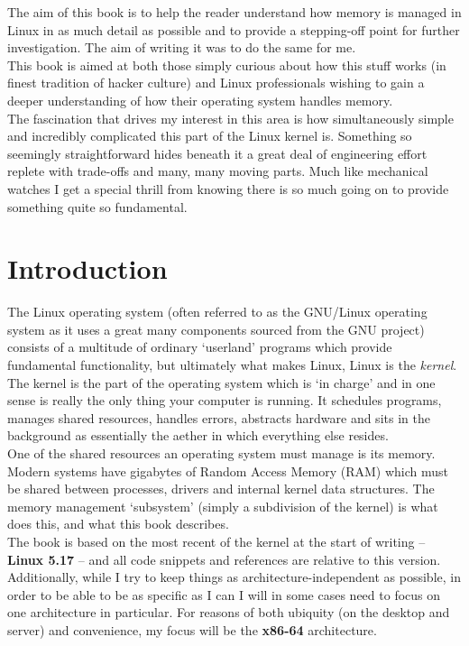 \documentclass[a4paper,oneside]{scrbook}
\begin{document}
The aim of this book is to help the reader understand how memory is managed in
Linux in as much detail as possible and to provide a stepping-off point for
further investigation. The aim of writing it was to do the same for me.\\

This book is aimed at both those simply curious about how this stuff works (in
finest tradition of hacker culture) and Linux professionals wishing to gain a
deeper understanding of how their operating system handles memory.\\


The fascination that drives my interest in this area is how simultaneously
simple and incredibly complicated this part of the Linux kernel is. Something so
seemingly straightforward hides beneath it a great deal of engineering effort
replete with trade-offs and many, many moving parts. Much like mechanical
watches I get a special thrill from knowing there is so much going on to provide
something quite so fundamental.\\

\mainmatter
\chapter{Introduction}

The Linux operating system (often referred to as the GNU/Linux operating system
as it uses a great many components sourced from the GNU project) consists of a
multitude of ordinary `userland' programs which provide fundamental
functionality, but ultimately what makes Linux, Linux is the \emph{kernel}.\\

The kernel is the part of the operating system which is `in charge' and in one
sense is really the only thing your computer is running. It schedules programs,
manages shared resources, handles errors, abstracts hardware and sits in the
background as essentially the aether in which everything else resides.\\

One of the shared resources an operating system must manage is its
memory. Modern systems have gigabytes of Random Access Memory (RAM) which must
be shared between processes, drivers and internal kernel data structures. The
memory management `subsystem' (simply a subdivision of the kernel) is what
does this, and what this book describes.\\

The book is based on the most recent of the kernel at the start of writing --
\textbf{Linux 5.17} -- and all code snippets and references are relative to this
version. Additionally, while I try to keep things as architecture-independent as
possible, in order to be able to be as specific as I can I will in some cases
need to focus on one architecture in particular. For reasons of both ubiquity
(on the desktop and server) and convenience, my focus will be the
\textbf{x86-64} architecture.\\
\end{document}
